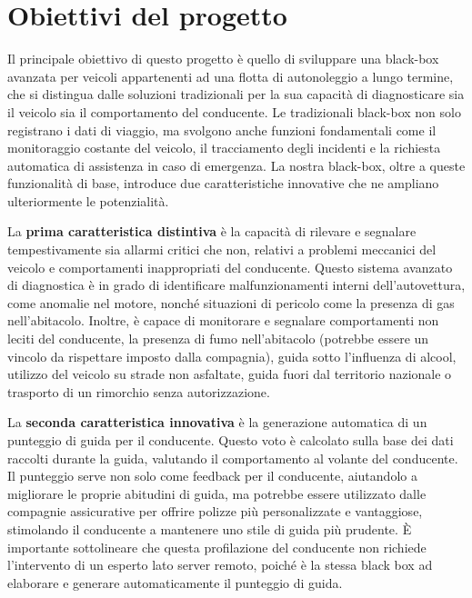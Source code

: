 \documentclass[12pt, a4paper, italian]{report}
\numberwithin{figure}{chapter}
\numberwithin{table}{chapter}
\begin{document}
\section{Obiettivi del progetto}
Il principale obiettivo di questo progetto è quello di sviluppare una black-box avanzata per veicoli appartenenti ad una flotta di autonoleggio a lungo termine, che si distingua dalle soluzioni tradizionali per la sua capacità di diagnosticare sia il veicolo sia il comportamento del conducente. Le tradizionali black-box non solo registrano i dati di viaggio, ma svolgono anche funzioni fondamentali come il monitoraggio costante del veicolo, il tracciamento degli incidenti e la richiesta automatica di assistenza in caso di emergenza. La nostra black-box, oltre a queste funzionalità di base, introduce due caratteristiche innovative che ne ampliano ulteriormente le potenzialità.

\vspace{1cm}

La \textbf{prima caratteristica distintiva} è la capacità di rilevare e segnalare tempestivamente sia allarmi critici che non, relativi a problemi meccanici del veicolo e comportamenti inappropriati del conducente. Questo sistema avanzato di diagnostica è in grado di identificare malfunzionamenti interni dell'autovettura, come anomalie nel motore, nonché situazioni di pericolo come la presenza di gas nell'abitacolo. Inoltre, è capace di monitorare e segnalare comportamenti non leciti del conducente, la presenza di fumo nell'abitacolo (potrebbe essere un vincolo da rispettare imposto dalla compagnia), guida sotto l'influenza di alcool, utilizzo del veicolo su strade non asfaltate, guida fuori dal territorio nazionale o trasporto di un rimorchio senza autorizzazione.

\vspace{1cm}

La \textbf{seconda caratteristica innovativa} è la generazione automatica di un punteggio di guida per il conducente. Questo voto è calcolato sulla base dei dati raccolti durante la guida, valutando il comportamento al volante del conducente. Il punteggio serve non solo come feedback per il conducente, aiutandolo a migliorare le proprie abitudini di guida, ma potrebbe essere utilizzato dalle compagnie assicurative per offrire polizze più personalizzate e vantaggiose, stimolando il conducente a mantenere uno stile di guida più prudente. È importante sottolineare che questa profilazione del conducente non richiede l'intervento di un esperto lato server remoto, poiché è la stessa black box ad elaborare e generare automaticamente il punteggio di guida.
\end{document}
